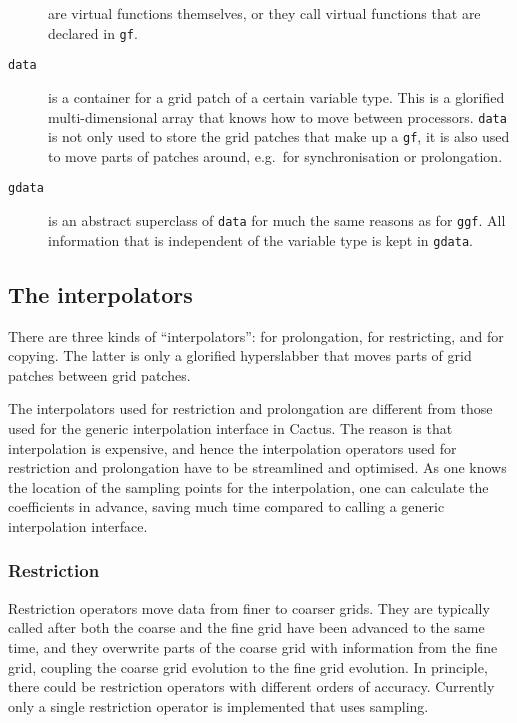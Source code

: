 \documentclass{article}
\begin{document}
\begin{description}
   are virtual functions themselves, or they call virtual functions
   that are declared in \texttt{gf}.
\item[\texttt{data}]
   is a container for a grid patch of a certain variable type.  This is
   a glorified multi-dimensional array that knows how to move between
   processors.  \texttt{data} is not only used to store the grid
   patches that make up a \texttt{gf}, it is also used to move parts
   of patches around, e.g.\ for synchronisation or prolongation.
\item[\texttt{gdata}]
   is an abstract superclass of \texttt{data} for much the same
   reasons as for \texttt{ggf}.  All information that is independent
   of the variable type is kept in \texttt{gdata}.
\end{description}



\subsection{The interpolators}

   There are three kinds of ``interpolators'': for prolongation, for
   restricting, and for copying.  The latter is only a glorified
   hyperslabber that moves parts of grid patches between grid patches.

   The interpolators used for restriction and prolongation are
   different from those used for the generic interpolation interface
   in Cactus.  The reason is that interpolation is expensive, and
   hence the interpolation operators used for restriction and
   prolongation have to be streamlined and optimised.  As one knows
   the location of the sampling points for the interpolation, one can
   calculate the coefficients in advance, saving much time compared to
   calling a generic interpolation interface.



\subsubsection{Restriction}

   Restriction operators move data from finer to coarser grids.  They
   are typically called after both the coarse and the fine grid have
   been advanced to the same time, and they overwrite parts of the
   coarse grid with information from the fine grid, coupling the
   coarse grid evolution to the fine grid evolution.  In principle,
   there could be restriction operators with different orders of
   accuracy.  Currently only a single restriction operator is
   implemented that uses sampling.
\end{document}
